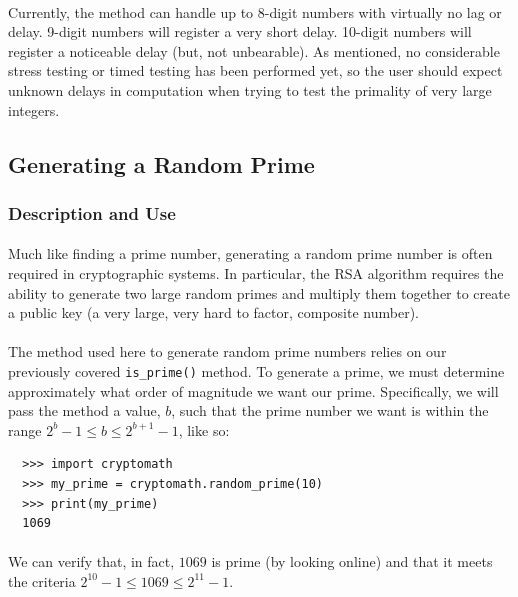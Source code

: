 \documentclass[12pt,a4paper]{article}
\begin{document}
\paragraph{}
Currently, the method can handle up to 8-digit numbers with virtually no lag 
or delay.  9-digit numbers will register a very short delay.  10-digit numbers 
will register a noticeable delay (but, not unbearable).  As mentioned, no 
considerable stress testing or timed testing has been performed yet, so the 
user should expect unknown delays in computation when trying to test the 
primality of very large integers.


\subsection{Generating a Random Prime}
\subsubsection{Description and Use}
\paragraph{}
Much like finding a prime number, generating a random prime number is often 
required in cryptographic systems.  In particular, the RSA algorithm 
requires the ability to generate two large random primes and multiply 
them together to create a public key (a very large, very hard to factor, 
composite number).

\paragraph{}
The method used here to generate random prime numbers relies on our previously 
covered \verb|is_prime()| method.  To generate a prime, we must determine 
approximately what order of magnitude we want our prime.  Specifically, we will 
pass the method a value, $b$, such that the prime number we want is within the 
range $2^{b} - 1 \le b \le 2^{b+1} - 1$, like so:

\begin{verbatim}
  >>> import cryptomath
  >>> my_prime = cryptomath.random_prime(10)
  >>> print(my_prime)
  1069
\end{verbatim}

\paragraph{}
We can verify that, in fact, $1069$ is prime (by looking online) and that it 
meets the criteria $2^{10} - 1 \le 1069 \le 2^{11} - 1$.
\end{document}

